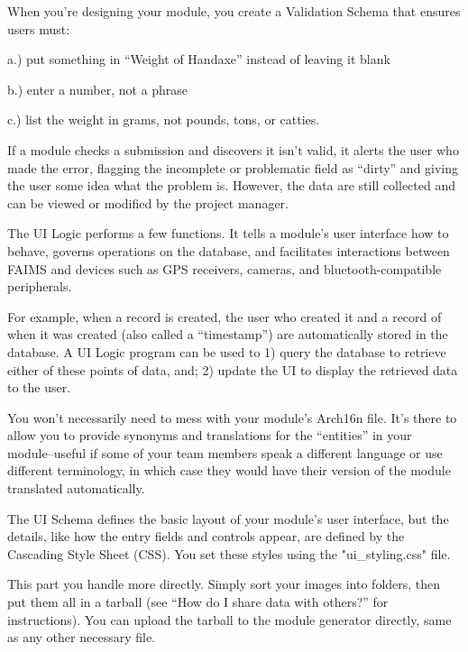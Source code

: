 When you're designing your module, you create a Validation Schema that ensures users must:

a.) put something in “Weight of Handaxe” instead of leaving it blank

b.) enter a number, not a phrase

c.) list the weight in grams, not pounds, tons, or catties.

If a module checks a submission and discovers it isn't valid, it alerts the user who made the error, flagging the incomplete or problematic field as “dirty” and giving the user some idea what the problem is. However, the data are still collected and can be viewed or modified by the project manager.


The UI Logic performs a few functions. It tells a module's user interface how to behave, governs operations on the database, and facilitates interactions between FAIMS and devices such as GPS receivers, cameras, and bluetooth-compatible peripherals.

For example, when a record is created, the user who created it and a record of when it was created (also called a “timestamp”) are automatically stored in the database. A UI Logic program can be used to 1) query the database to retrieve either of these points of data, and; 2) update the UI to display the retrieved data to the user.


You won't necessarily need to mess with your module's Arch16n file. It's there to allow you to provide synonyms and translations for the “entities” in your module--useful if some of your team members speak a different language or use different terminology, in which case they would have their version of the module translated automatically.


The UI Schema defines the basic layout of your module's user interface, but the details, like how the entry fields and controls appear, are defined by the Cascading Style Sheet (CSS). You set these styles using the "ui_styling.css" file.


This part you handle more directly. Simply sort your images into folders, then put them all in a tarball (see “How do I share data with others?” for instructions). You can upload the tarball to the module generator directly, same as any other necessary file.

